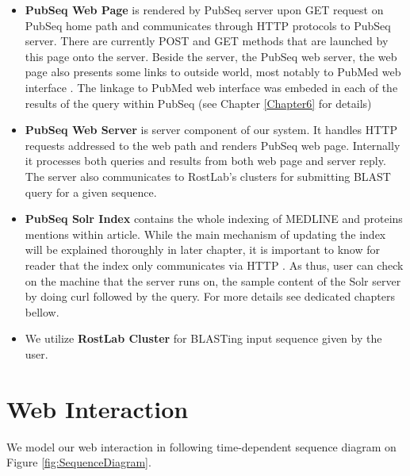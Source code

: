 \begin{itemize}
\item \textbf{PubSeq Web Page} is rendered by PubSeq server upon GET request on PubSeq home path and communicates through HTTP protocols to PubSeq server. There are currently POST and GET methods that are launched by this page onto the server. Beside the server, the PubSeq web server, the web page also presents some links to outside world, most notably to PubMed web interface \citep{MELDINEWeb}. The linkage to PubMed web interface was embeded in each of the results of the query within PubSeq (see Chapter \ref{Chapter6} for details)
\item \textbf{PubSeq Web Server} is server component of our system. It handles HTTP requests addressed to the web path and renders PubSeq web page. Internally it processes both queries and results from both web page and server reply. The server also communicates to RostLab's clusters for submitting BLAST query for a given sequence.
\item \textbf{PubSeq Solr Index} contains the whole indexing of MEDLINE and proteins mentions within article. While the main mechanism of updating the index will be explained thoroughly in later chapter, it is important to know for reader that the index only communicates via HTTP \citep{smiley2015apache}. As thus, user can check on the machine that the server runs on, the sample content of the Solr server by doing curl followed by the query. For more details see dedicated chapters bellow.
\item We utilize \textbf{RostLab Cluster} for BLASTing input sequence given by the user.
\end{itemize}


\section{Web Interaction}

We model our web interaction in following time-dependent sequence diagram \citep{rumbaugh2004unified} on Figure \ref{fig:SequenceDiagram}.


